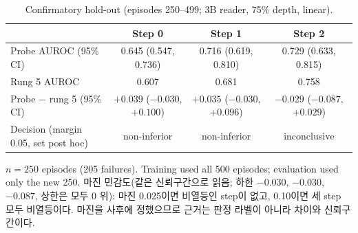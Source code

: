 \begin{table}[htbp]
\centering\small
\caption{Confirmatory hold-out (episodes 250--499; 3B reader, 75\% depth, linear).}\label{tab:confirm}
\begin{tabularx}{\linewidth}{@{}Lccc@{}}
\toprule
 & Step 0 & Step 1 & Step 2 \\
\midrule
Probe AUROC (95\% CI) & 0.645 (0.547, 0.736) & 0.716 (0.619, 0.810) & 0.729 (0.633, 0.815) \\
Rung 5 AUROC & 0.607 & 0.681 & 0.758 \\
Probe $-$ rung 5 (95\% CI) & $+0.039$ ($-0.030$, $+0.100$) & $+0.035$ ($-0.030$, $+0.096$) & $-0.029$ ($-0.087$, $+0.029$) \\
Decision (margin 0.05, set post hoc) & non-inferior & non-inferior & inconclusive \\
\bottomrule
\end{tabularx}
\par\smallskip\raggedright\footnotesize
$n = 250$ episodes (205 failures). Training used all 500 episodes; evaluation used only the new 250. 마진 민감도(같은 신뢰구간으로 읽음; 하한 $-0.030$, $-0.030$, $-0.087$, 상한은 모두 0 위): 마진 0.025이면 비열등인 step이 없고, 0.10이면 세 step 모두 비열등이다. 마진을 사후에 정했으므로 근거는 판정 라벨이 아니라 차이와 신뢰구간이다.
\end{table}
